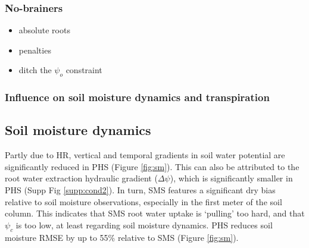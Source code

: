 \documentclass[draft,linenumbers]{agujournal}
\begin{document}
\subsubsection{No-brainers}

\begin{itemize}
\item absolute roots
\item penalties
\item ditch the $\psi_o$ constraint
\end{itemize}


\subsubsection{Influence on soil moisture dynamics and transpiration}


\subsection{Soil moisture dynamics}
    \label{sect:smt}

    Partly due to HR, vertical and temporal gradients in soil water potential are significantly reduced in PHS (Figure \ref{fig:sm}).
    This can also be attributed to the root water extraction hydraulic gradient ($\Delta\psi$), which is significantly smaller in PHS (Supp Fig \ref{supp:cond2}).
    In turn, SMS features a significant dry bias relative to soil moisture observations, especially in the first meter of the soil column.
    This indicates that SMS root water uptake is `pulling' too hard, and that $\psi_c$ is too low, at least regarding soil moisture dynamics.
    PHS reduces soil moisture RMSE by up to 55\% relative to SMS (Figure \ref{fig:sm}).
    
\end{document}
